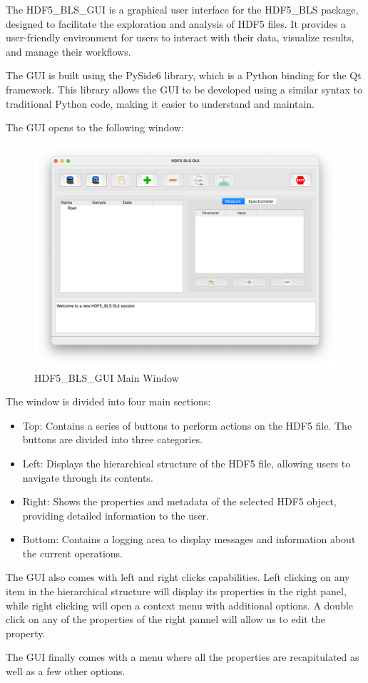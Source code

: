 The HDF5\_BLS\_GUI is a graphical user interface for the HDF5\_BLS package, designed to facilitate the exploration and analysis of HDF5 files. It provides a user-friendly environment for users to interact with their data, visualize results, and manage their workflows.

The GUI is built using the PySide6 library, which is a Python binding for the Qt framework. This library allows the GUI to be developed using a similar syntax to traditional Python code, making it easier to understand and maintain.

The GUI opens to the following window:
\begin{figure}[H]
    \centering
    \includegraphics[width=\textwidth]{img/main_window.png}
    \caption{HDF5\_BLS\_GUI Main Window}
    \label{fig:gui_main_window}
\end{figure}

The window is divided into four main sections:
\begin{itemize}
    \item Top: Contains a series of buttons to perform actions on the HDF5 file. The buttons are divided into three categories.
    \item Left: Displays the hierarchical structure of the HDF5 file, allowing users to navigate through its contents.
    \item Right: Shows the properties and metadata of the selected HDF5 object, providing detailed information to the user.
    \item Bottom: Contains a logging area to display messages and information about the current operations.
\end{itemize}

The GUI also comes with left and right clicks capabilities. Left clicking on any item in the hierarchical structure will display its properties in the right panel, while right clicking will open a context menu with additional options. A double click on any of the properties of the right pannel will allow us to edit the property.

The GUI finally comes with a menu where all the properties are recapitulated as well as a few other options.
